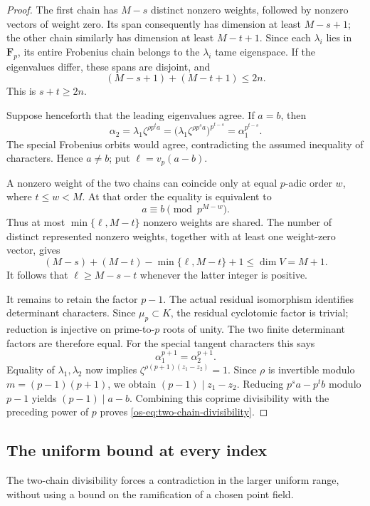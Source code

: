 \begin{proof}
The first chain has $M-s$ distinct nonzero weights, followed by
nonzero vectors of weight zero.  Its span consequently has dimension
at least $M-s+1$; the other chain similarly has dimension at least
$M-t+1$.  Since each $\lambda_i$ lies in $\mathbf F_p$, its entire
Frobenius chain belongs to the $\lambda_i$ tame eigenspace.  If the
eigenvalues differ, these spans are disjoint, and
\[
 (M-s+1)+(M-t+1)\le2n.
\]
This is $s+t\ge2n$.

Suppose henceforth that the leading eigenvalues agree.  If $a=b$,
then
\[
 \alpha_2
 =\lambda_1\zeta^{\rho p^t a}
 =\bigl(\lambda_1\zeta^{\rho p^s a}\bigr)^{p^{t-s}}
 =\alpha_1^{p^{t-s}}.
\]
The special Frobenius orbits would agree, contradicting the assumed
inequality of characters.  Hence $a\ne b$; put
$\ell=v_p(a-b)$.

A nonzero weight of the two chains can coincide only at equal
$p$-adic order $w$, where $t\le w<M$.  At that order the equality
is equivalent to
\[
 a\equiv b\pmod {p^{M-w}}.
\]
Thus at most $\min\{\ell,M-t\}$ nonzero weights are shared.  The
number of distinct represented nonzero weights, together with at
least one weight-zero vector, gives
\[
 (M-s)+(M-t)-\min\{\ell,M-t\}+1\le\dim V=M+1.
\]
It follows that $\ell\ge M-s-t$ whenever the latter integer is
positive.

It remains to retain the factor $p-1$.  The actual residual
isomorphism identifies determinant characters.  Since $\mu_p\subset
K$, the residual cyclotomic factor is trivial; reduction is injective
on prime-to-$p$ roots of unity.  The two finite determinant factors
are therefore equal.  For the special tangent characters this says
\[
 \alpha_1^{p+1}=\alpha_2^{p+1}.
\]
Equality of $\lambda_1,\lambda_2$ now implies
$\zeta^{\rho(p+1)(z_1-z_2)}=1$.  Since $\rho$ is invertible modulo
$m=(p-1)(p+1)$, we obtain $(p-1)\mid z_1-z_2$.  Reducing
$p^s a-p^t b$ modulo $p-1$ yields $(p-1)\mid a-b$.
Combining this coprime divisibility with the preceding power of $p$
proves \eqref{os-eq:two-chain-divisibility}.
\end{proof}


\subsection{The uniform bound at every index}
The two-chain divisibility forces a contradiction in the larger uniform range, without using a bound on the ramification of a chosen point field.

